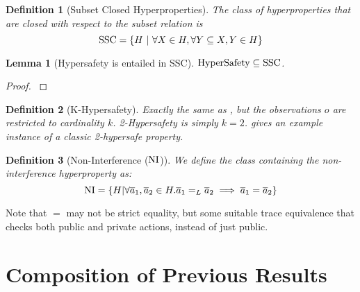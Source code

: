 \documentclass[a4paper,names,dvipsnames]{article}
\newtheorem{definition}{Definition}
\newtheorem{lemma}{Lemma}
\begin{document}
\begin{definition}[Subset Closed Hyperproperties]
  The class of hyperproperties that are closed with respect to the subset relation is
  $$
  \cSS = \left\{H\ |\ \forall X\in H, \forall Y\subseteq X, Y \in H\right\}
  $$
\end{definition}

\begin{lemma}[Hypersafety is entailed in SSC]
  $\text{HyperSafety}\subseteq\text{SSC}$.
\end{lemma}
\begin{proof}
  \cite{clarkson08}
\end{proof}

\begin{definition}[K-Hypersafety]
  Exactly the same as , but the observations $o$ are restricted to cardinality $k$.
  2-Hypersafety is simply $k=2$.  gives an example instance of a classic 2-hypersafe property.
\end{definition}

\begin{definition}[Non-Interference ($\text{NI}$)]\label{def:ni}
  We define the class containing the non-interference hyperproperty as:
  $$
  \text{NI} = \left\{ H | \forall \overline{a}_{1},\overline{a}_{2}\in H. {\overline{a}_{1}}=_L{\overline{a}_{2}}\implies\overline{a}_{1}=\overline{a}_{2} \right\}
  $$
\end{definition}
Note that $=$ may not be strict equality, but some suitable trace equivalence that checks both public and private actions, instead of just public.

\section{Composition of Previous Results}
\end{document}

